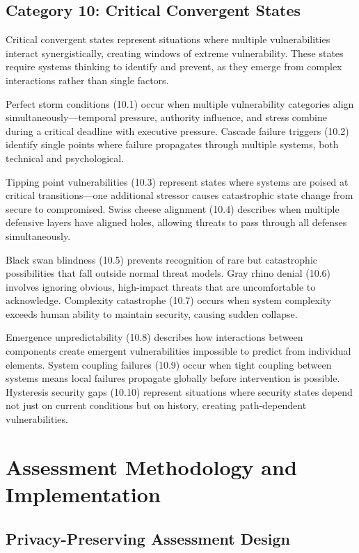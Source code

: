 \documentclass[11pt,a4paper]{article}
\begin{document}
\subsection{Category 10: Critical Convergent States}

Critical convergent states represent situations where multiple vulnerabilities interact synergistically, creating windows of extreme vulnerability. These states require systems thinking to identify and prevent, as they emerge from complex interactions rather than single factors.

Perfect storm conditions (10.1) occur when multiple vulnerability categories align simultaneously—temporal pressure, authority influence, and stress combine during a critical deadline with executive pressure. Cascade failure triggers (10.2) identify single points where failure propagates through multiple systems, both technical and psychological.

Tipping point vulnerabilities (10.3) represent states where systems are poised at critical transitions—one additional stressor causes catastrophic state change from secure to compromised. Swiss cheese alignment (10.4) describes when multiple defensive layers have aligned holes, allowing threats to pass through all defenses simultaneously.

Black swan blindness (10.5) prevents recognition of rare but catastrophic possibilities that fall outside normal threat models. Gray rhino denial (10.6) involves ignoring obvious, high-impact threats that are uncomfortable to acknowledge. Complexity catastrophe (10.7) occurs when system complexity exceeds human ability to maintain security, causing sudden collapse.

Emergence unpredictability (10.8) describes how interactions between components create emergent vulnerabilities impossible to predict from individual elements. System coupling failures (10.9) occur when tight coupling between systems means local failures propagate globally before intervention is possible. Hysteresis security gaps (10.10) represent situations where security states depend not just on current conditions but on history, creating path-dependent vulnerabilities.

\section{Assessment Methodology and Implementation}

\subsection{Privacy-Preserving Assessment Design}
\end{document}

